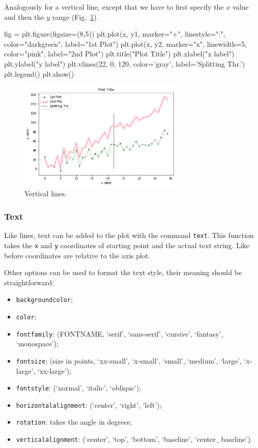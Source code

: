 Analogously for a vertical line, except that we have to first specify the $x$ value and then the $y$ range (Fig.~\ref{fig:lines2}).

\begin{ipythonnon}
fig = plt.figure(figsize=(8,5))
plt.plot(x, y1, marker="+", linestyle=":", color="darkgreen", label="1st Plot")
plt.plot(x, y2, marker="x", linewidth=5, color="pink", label="2nd Plot")
plt.title("Plot Title")
plt.xlabel("x label")
plt.ylabel("y label")
plt.vlines(22, 0, 120, color='gray', label='Splitting Thr.')
plt.legend()
plt.show()
\end{ipythonnon}

\begin{figure}[htb]
	\centering
	\includegraphics[width=0.7\textwidth]{figures/lines2}
	\caption{Vertical lines.}
	\label{fig:lines2}
\end{figure}

\subsubsection{Text}\label{text}

Like lines, text can be added to the plot with the command \texttt{text}.
This function takes the \texttt{x} and \texttt{y} coordinates of starting point and the actual text string. Like before coordinates are relative to the axis plot.

Other options can be used to format the text style, their meaning should be straightforward:

\begin{itemize}
\tightlist
\item \texttt{backgroundcolor};
\item \texttt{color};
\item \texttt{fontfamily}: (FONTNAME, `serif', `sans-serif', `cursive', `fantasy', `monospace');
\item \texttt{fontsize}; (size in points, `xx-small', `x-small', `small', `medium', `large', `x-large', `xx-large');
\item \texttt{fontstyle}: (`normal', `italic', `oblique');
\item \texttt{horizontalalignment}: (`center', `right', `left');
\item \texttt{rotation}: takes the angle in degrees;
\item \texttt{verticalalignment}: (`center', `top', `bottom', `baseline', `center\_baseline').
\end{itemize}

